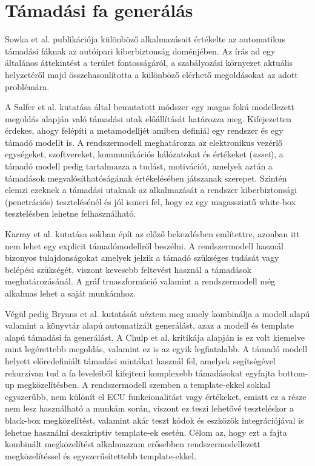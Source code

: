 \section{Támadási fa generálás}

Sowka et al.\cite{Sowka} publikációja különböző alkalmazásait értékelte az automatikus támadási fáknak az autóipari kiberbiztonság doménjében. Az írás ad egy általános áttekintést a terület fontosságáról, a szabályozási környezet aktuális helyzetéről majd összehasonlította a különböző elérhető megoldásokat az adott problémára.

A Salfer et al.\cite{Salfer} kutatása által bemutatott módszer egy magas fokú modellezett megoldás alapján való támadási utak előállítását határozza meg. Kifejezetten érdekes, ahogy felépíti a metamodelljét amiben definiál egy rendszer és egy támadó modellt is. A rendszermodell meghatározza az elektronikus vezérlő egységeket, szoftvereket, kommunikációs hálózatokat és értékeket (\textit{asset}), a támadó modell pedig tartalmazza a tudást, motivációt, amelyek aztán a támadások megvalósíthatóságának értékelésében játszanak szerepet. Szintén elemzi ezeknek a támadási utaknak az alkalmazását a rendszer kiberbiztonsági (penetrációs) tesztelésénél és jól ismeri fel, hogy ez egy magasszintű white-box tesztelésben lehetne felhasználható. 

Karray et al.\cite{Karray} kutatása sokban épít az előző bekezdésben említettre, azonban itt nem lehet egy explicit támadómodellről beszélni. A rendszermodell használ bizonyos tulajdonságokat amelyek jelzik a támadó szükséges tudását vagy belépési szükségét, viszont kevesebb feltevést használ a támadások meghatározásánál. A gráf trnaszformáció valamint a rendszermodell még alkalmas lehet a saját munkámhoz.

Végül pedig Bryans et al.\cite{Bryans} kutatását néztem meg amely kombinálja a modell alapú valamint a könyvtár alapú automatizált generálást, azaz a modell és template alapú támadási fa generálást. A Chulp et al.\cite{Chulp} kritikája alapján is ez volt kiemelve mint legérettebb megoldás, valamint ez is az egyik legfiatalabb. A támadó modell helyett előredefiniált támadási mintákat használ fel, amelyek segítségével rekurzívan tud a fa leveleiből kifejteni komplexebb támadásokat egyfajta bottom-up megközelítésben. A rendszermodell szemben a template-ekkel sokkal egyszerűbb, nem különít el ECU funkcionalitást vagy értékeket, emiatt ez a része nem lesz használható a munkám során, viszont ez teszi lehetővé teszteléskor a black-box megközelítést, valamint akár teszt kódok és eszközök integrációjával is lehetne használni deszkriptív template-ek esetén. Célom az, hogy ezt a fajta kombinált megközelítést alkalmazzam erősebben rendszermodellezett megközelítéssel és egyszerűsítettebb template-ekkel.
